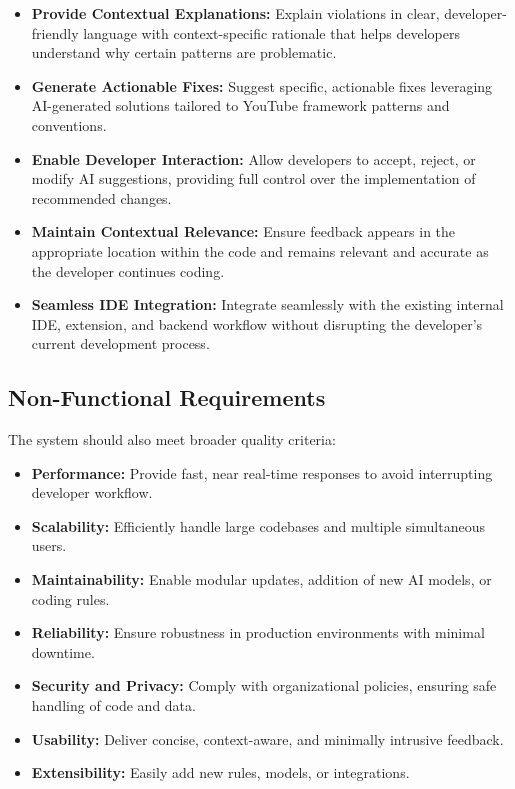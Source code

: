 \begin{spacing}{1.2}
\begin{itemize}
    \item \textbf{Provide Contextual Explanations:} Explain violations in clear, developer-friendly language with context-specific rationale that helps developers understand why certain patterns are problematic.
    
    \item \textbf{Generate Actionable Fixes:} Suggest specific, actionable fixes leveraging AI-generated solutions tailored to YouTube framework patterns and conventions.
    
    \item \textbf{Enable Developer Interaction:} Allow developers to accept, reject, or modify AI suggestions, providing full control over the implementation of recommended changes.
    
    \item \textbf{Maintain Contextual Relevance:} Ensure feedback appears in the appropriate location within the code and remains relevant and accurate as the developer continues coding.
    
    \item \textbf{Seamless IDE Integration:} Integrate seamlessly with the existing internal IDE, extension, and backend workflow without disrupting the developer's current development process.
\end{itemize}

\subsection{Non-Functional Requirements}
The system should also meet broader quality criteria:
\begin{itemize}
    \item \textbf{Performance:} Provide fast, near real-time responses to avoid interrupting developer workflow.
    \item \textbf{Scalability:} Efficiently handle large codebases and multiple simultaneous users.
    \item \textbf{Maintainability:} Enable modular updates, addition of new AI models, or coding rules.
    \item \textbf{Reliability:} Ensure robustness in production environments with minimal downtime.
    \item \textbf{Security and Privacy:} Comply with organizational policies, ensuring safe handling of code and data.
    \item \textbf{Usability:} Deliver concise, context-aware, and minimally intrusive feedback.
    \item \textbf{Extensibility:} Easily add new rules, models, or integrations.
\end{itemize}


\end{spacing}
